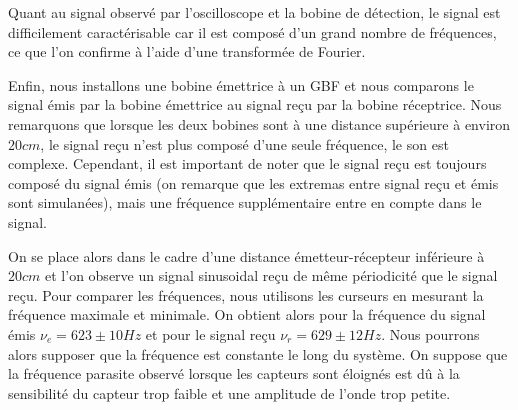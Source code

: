 \documentclass[11pt]{article}
\begin{document}
Quant au signal observé par l'oscilloscope et la bobine de détection, le signal est difficilement caractérisable car il est composé d'un grand nombre de fréquences, ce que
l'on confirme à l'aide d'une transformée de Fourier.

Enfin, nous installons une bobine émettrice à un GBF  et nous comparons le signal émis par la bobine émettrice au signal reçu par la bobine réceptrice.
Nous remarquons que lorsque les deux bobines sont à une distance supérieure à environ $20cm$, le signal reçu n'est plus composé d'une seule fréquence, le son est complexe.
Cependant, il est important de noter que le signal reçu est toujours composé du signal émis (on remarque que les extremas entre signal reçu et émis sont simulanées), mais une fréquence supplémentaire
entre en compte dans le signal. 

On se place alors dans le cadre d'une distance émetteur-récepteur inférieure à $20cm$ et l'on observe un signal sinusoidal reçu de même périodicité que le signal reçu. Pour comparer les fréquences,
nous utilisons les curseurs en mesurant la fréquence maximale et minimale. On obtient alors pour la fréquence du signal émis $\nu_e = 623 \pm 10 Hz$ et pour le signal reçu $\nu_r = 629 \pm 12 Hz$. Nous pourrons alors supposer
que la fréquence est constante le long du système. On suppose que la fréquence parasite observé lorsque les capteurs sont éloignés est dû à la sensibilité du capteur trop faible et une amplitude de l'onde trop petite. 

\break
\end{document}
